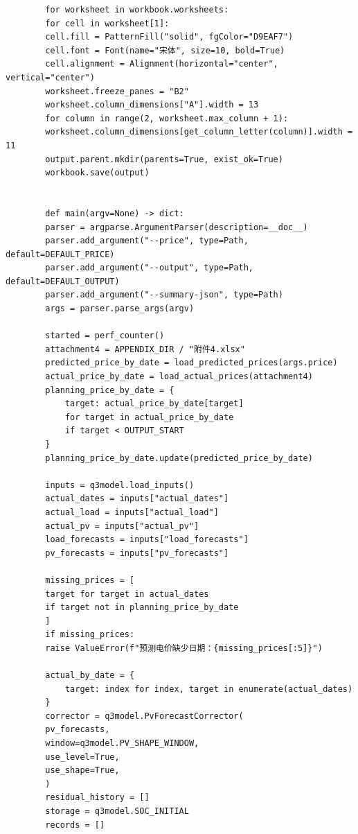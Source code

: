 \documentclass[UTF8]{ctexart}
\begin{document}
\begin{verbatim}
        for worksheet in workbook.worksheets:
        for cell in worksheet[1]:
        cell.fill = PatternFill("solid", fgColor="D9EAF7")
        cell.font = Font(name="宋体", size=10, bold=True)
        cell.alignment = Alignment(horizontal="center", vertical="center")
        worksheet.freeze_panes = "B2"
        worksheet.column_dimensions["A"].width = 13
        for column in range(2, worksheet.max_column + 1):
        worksheet.column_dimensions[get_column_letter(column)].width = 11
        output.parent.mkdir(parents=True, exist_ok=True)
        workbook.save(output)
        
        
        def main(argv=None) -> dict:
        parser = argparse.ArgumentParser(description=__doc__)
        parser.add_argument("--price", type=Path, default=DEFAULT_PRICE)
        parser.add_argument("--output", type=Path, default=DEFAULT_OUTPUT)
        parser.add_argument("--summary-json", type=Path)
        args = parser.parse_args(argv)
        
        started = perf_counter()
        attachment4 = APPENDIX_DIR / "附件4.xlsx"
        predicted_price_by_date = load_predicted_prices(args.price)
        actual_price_by_date = load_actual_prices(attachment4)
        planning_price_by_date = {
            target: actual_price_by_date[target]
            for target in actual_price_by_date
            if target < OUTPUT_START
        }
        planning_price_by_date.update(predicted_price_by_date)
        
        inputs = q3model.load_inputs()
        actual_dates = inputs["actual_dates"]
        actual_load = inputs["actual_load"]
        actual_pv = inputs["actual_pv"]
        load_forecasts = inputs["load_forecasts"]
        pv_forecasts = inputs["pv_forecasts"]
        
        missing_prices = [
        target for target in actual_dates
        if target not in planning_price_by_date
        ]
        if missing_prices:
        raise ValueError(f"预测电价缺少日期：{missing_prices[:5]}")
        
        actual_by_date = {
            target: index for index, target in enumerate(actual_dates)
        }
        corrector = q3model.PvForecastCorrector(
        pv_forecasts,
        window=q3model.PV_SHAPE_WINDOW,
        use_level=True,
        use_shape=True,
        )
        residual_history = []
        storage = q3model.SOC_INITIAL
        records = []
        

\end{verbatim}
\end{document}
